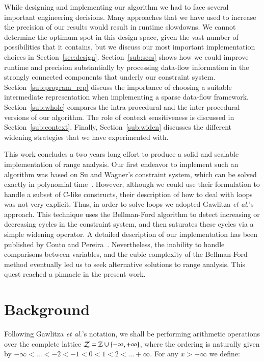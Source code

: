 \documentclass[preprint]{elsarticle}
\begin{document}
While designing and implementing our algorithm we had to face several important
engineering decisions.
Many approaches that we have used to increase the precision of
our results would result in runtime slowdowns.
We cannot determine the optimum spot in this design space, given the
vast number of possibilities that it contains, but we discuss our most important
implementation choices in Section~\ref{sec:design}.
Section~\ref{sub:sccs} shows how we could improve runtime and precision
substantially by processing data-flow information in the strongly connected
components that underly our constraint system.
Section~\ref{sub:program_rep} discuss the importance of choosing a suitable
intermediate representation when implementing a sparse data-flow framework.
Section~\ref{sub:whole} compares the intra-procedural and the inter-procedural
versions of our algorithm.
The role of context sensitiveness is discussed in Section~\ref{sub:context}.
Finally, Section~\ref{sub:widen} discusses the different widening strategies
that we have experimented with.

This work concludes a two years long effort to produce a solid and scalable
implementation of range analysis.
Our first endeavor to implement such an algorithm was based on Su and
Wagner's constraint system, which can be solved exactly in polynomial
time~\cite{Su05,Su04}.
However, although we could use their formulation to handle a subset of C-like
constructs, their description of how to deal with loops was not very explicit.
Thus, in order to solve loops we adopted Gawlitza
{\em et al.}'s~\cite{Gawlitza09} approach.
This technique uses the Bellman-Ford algorithm to detect increasing or
decreasing cycles in the constraint system, and then saturates these cycles
via a simple widening operator.
A detailed description of our implementation has been published by
Couto and Pereira~\cite{Couto11}.
Nevertheless, the inability to handle comparisons between variables, and the
cubic complexity of the Bellman-Ford method eventually led us to seek
alternative solutions to range analysis.
This quest reached a pinnacle in the present work.

\section{Background}
\label{sec:bck}

Following Gawlitza {\em et al.}'s notation, we shall be performing arithmetic
operations over the complete lattice
$\cal{Z} = \mathbb{Z} \cup \{-\infty, +\infty\}$, where the ordering is
naturally given by $-\infty < \ldots < -2 < -1 < 0 < 1 < 2 < \ldots +\infty$.
For any $x > -\infty$ we define:
\end{document}
